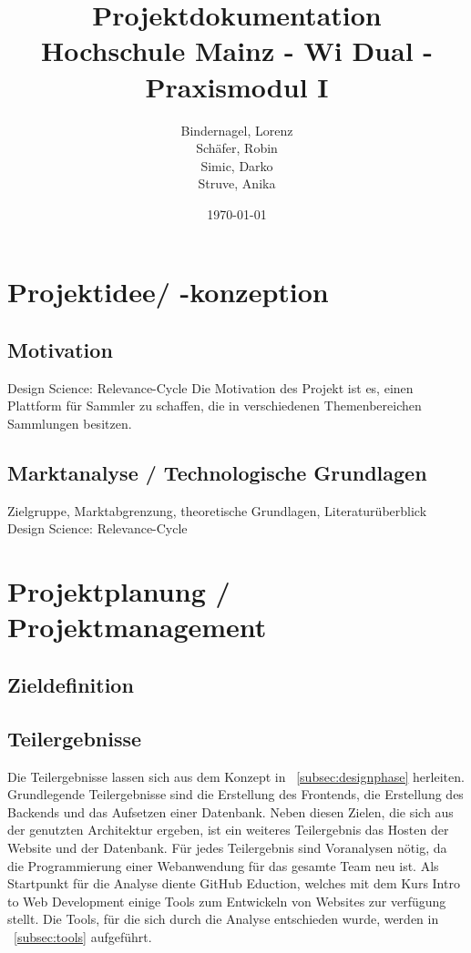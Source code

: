 \documentclass[a4paper, 12pt]{article}
\title{
    Projektdokumentation\\
    Hochschule Mainz - Wi Dual - Praxismodul I
}
\author{
    Bindernagel, Lorenz\\
    Schäfer, Robin\\
    Simic, Darko\\
    Struve, Anika
}
\date{
    \today
}
\begin{document}
    \maketitle
    \tableofcontents
    \newpage

    \onehalfspacing

    \section{Projektidee/ -konzeption}
    
    \subsection{Motivation}
    Design Science: Relevance-Cycle
    Die Motivation des Projekt ist es, einen Plattform für Sammler zu schaffen, die in verschiedenen Themenbereichen Sammlungen besitzen.


    \subsection{Marktanalyse / Technologische Grundlagen}
    Zielgruppe, Marktabgrenzung, theoretische Grundlagen, Literaturüberblick\linebreak
    Design Science: Relevance-Cycle

    \newpage

    \section{Projektplanung / Projektmanagement}
    
    \subsection{Zieldefinition}

    \subsection{Teilergebnisse}
    Die Teilergebnisse lassen sich aus dem Konzept in ~\ref{subsec:designphase} herleiten.
    Grundlegende Teilergebnisse sind die Erstellung des Frontends, die Erstellung des Backends und das Aufsetzen einer Datenbank.
    Neben diesen Zielen, die sich aus der genutzten Architektur ergeben, ist ein weiteres Teilergebnis das Hosten der Website und der Datenbank.
    Für jedes Teilergebnis sind Voranalysen nötig, da die Programmierung einer Webanwendung für das gesamte Team neu ist.
    Als Startpunkt für die Analyse diente GitHub Eduction, welches mit dem Kurs Intro to Web Development einige Tools zum Entwickeln von Websites zur verfügung stellt.
    Die Tools, für die sich durch die Analyse entschieden wurde, werden in ~\ref{subsec:tools} aufgeführt.
\end{document}
